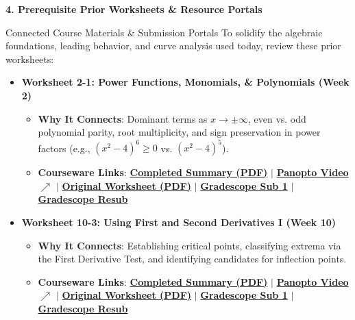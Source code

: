 \documentclass[11pt]{article}
\begin{document}
\vspace{1pt}
\textbf{\normalsize \textcolor{dukeNavy}{4. Prerequisite Prior Worksheets \& Resource Portals}}
\vspace{1pt}

\begin{refbox}{Connected Course Materials \& Submission Portals}
To solidify the algebraic foundations, leading behavior, and curve analysis used today, review these prior worksheets:
\vspace{2pt}

\begin{itemize}[leftmargin=1.2em, itemsep=3.5pt, topsep=1pt]
  \item \textbf{\normalsize Worksheet 2-1: Power Functions, Monomials, \& Polynomials (Week 2)}
  \begin{itemize}[leftmargin=1.2em, itemsep=1.5pt, topsep=0.5pt]
    \item \textbf{Why It Connects}: Dominant terms as $x \to \pm\infty$, even vs. odd polynomial parity, root multiplicity, and sign preservation in power factors (e.g., $(x^2 - 4)^6 \ge 0$ vs. $(x^2 - 4)^5$).
    \item \textbf{Courseware Links}: 
      \href{https://rannbar-on.com/105LFall26/completed_sheets/Math105L_Lecture_2-1_Completed_Sheet.pdf}{\textbf{Completed Summary (PDF)}} $\vert$
      \href{https://duke.hosted.panopto.com/Panopto/Pages/Viewer.aspx?id=37fe672c-6178-4cc8-b8ce-b4a901320352}{\textbf{Panopto Video $\nearrow$}} $\vert$
      \href{https://rannbar-on.com/duke/classworksheets105Lpdfs/2-1.pdf}{\textbf{Original Worksheet (PDF)}} $\vert$
      \href{https://www.gradescope.com/courses/1318300/assignments/8177952}{\textbf{Gradescope Sub 1}} $\vert$
      \href{https://www.gradescope.com/courses/1318300/assignments/8617938}{\textbf{Gradescope Resub}}
  \end{itemize}

  \item \textbf{\normalsize Worksheet 10-3: Using First and Second Derivatives I (Week 10)}
  \begin{itemize}[leftmargin=1.2em, itemsep=1.5pt, topsep=0.5pt]
    \item \textbf{Why It Connects}: Establishing critical points, classifying extrema via the First Derivative Test, and identifying candidates for inflection points.
    \item \textbf{Courseware Links}: 
      \href{https://rannbar-on.com/105LFall26/completed_sheets/Math105L_Lecture_10-3_Completed_Sheet.pdf}{\textbf{Completed Summary (PDF)}} $\vert$
      \href{https://duke.hosted.panopto.com/Panopto/Pages/Viewer.aspx?id=a707feea-9f08-49a0-8bb7-b4a901306b01}{\textbf{Panopto Video $\nearrow$}} $\vert$
      \href{https://rannbar-on.com/duke/classworksheets105Lpdfs/10-3.pdf}{\textbf{Original Worksheet (PDF)}} $\vert$
      \href{https://www.gradescope.com/courses/1318300/assignments/8177894}{\textbf{Gradescope Sub 1}} $\vert$
      \href{https://www.gradescope.com/courses/1318300/assignments/8177925}{\textbf{Gradescope Resub}}
  \end{itemize}
\end{itemize}
\end{refbox}
\end{document}
